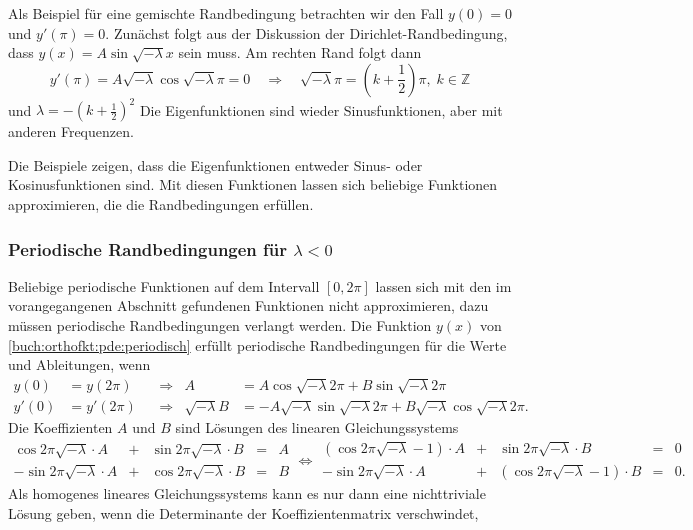 Als Beispiel für eine gemischte Randbedingung betrachten wir den
Fall $y(0)=0$ und $y'(\pi)=0$.
Zunächst folgt aus der Diskussion der Dirichlet-Randbedingung, dass
$y(x)=A\sin\sqrt{-\lambda}x$ sein muss.
Am rechten Rand folgt dann
\[
y'(\pi)
=
A\sqrt{-\lambda}\cos\sqrt{-\lambda}\pi
=
0
\quad\Rightarrow\quad
\sqrt{-\lambda}\pi = (k+{\textstyle\frac12})\pi,\;k\in\mathbb{Z}
\]
und $\lambda = -(k+{\textstyle\frac12})^2$
Die Eigenfunktionen sind wieder Sinusfunktionen, aber mit anderen
Frequenzen.

Die Beispiele zeigen, dass die Eigenfunktionen entweder Sinus-
oder Kosinusfunktionen sind.
Mit diesen Funktionen lassen sich beliebige Funktionen approximieren,
die die Randbedingungen erfüllen.

%
%
\subsubsection{Periodische Randbedingungen für $\lambda < 0$}
Beliebige periodische Funktionen auf dem Intervall $[0,2\pi]$ lassen sich
mit den im vorangegangenen Abschnitt gefundenen Funktionen nicht
approximieren, dazu müssen periodische Randbedingungen verlangt werden.
Die Funktion $y(x)$ von
\eqref{buch:orthofkt:pde:periodisch}
erfüllt periodische Randbedingungen für die Werte und Ableitungen, wenn
\begin{align*}
y(0) &= y(2\pi) 
&&\Rightarrow&
A &= A\cos\sqrt{-\lambda}2\pi + B\sin\sqrt{-\lambda}2\pi
\\
y'(0)&=y'(2\pi)
&&\Rightarrow&
\sqrt{-\lambda}B
&=
-
A\sqrt{-\lambda}\sin\sqrt{-\lambda}2\pi
+
B\sqrt{-\lambda}\cos\sqrt{-\lambda}2\pi.
\end{align*}
Die Koeffizienten $A$ und $B$ sind Lösungen des linearen Gleichungssystems
\[
\renewcommand{\arraycolsep}{2pt}
\begin{array}{rcrcr}
\cos2\pi\sqrt{-\lambda} \cdot A
&+&
\sin2\pi\sqrt{-\lambda} \cdot B
&=& A
\\
-\sin2\pi\sqrt{-\lambda} \cdot A
&+&
\cos2\pi\sqrt{-\lambda} \cdot B
&=& B
\end{array}
\Leftrightarrow
\begin{array}{rcrcl}
(\cos2\pi\sqrt{-\lambda}-1) \cdot A
&+&
\sin2\pi\sqrt{-\lambda} \cdot B
&=&
0
\\
-\sin2\pi\sqrt{-\lambda} \cdot A
&+&
(\cos2\pi\sqrt{-\lambda}-1) \cdot B
&=& 0.
\end{array}
\]
Als homogenes lineares Gleichungssystems kann es nur dann eine nichttriviale
Lösung geben, wenn die Determinante der Koeffizientenmatrix verschwindet,
